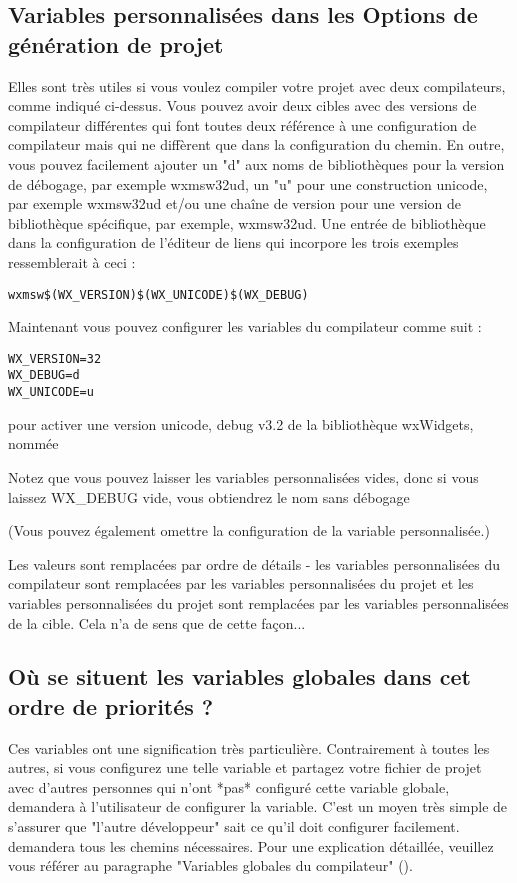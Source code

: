 \subsection{Variables personnalisées dans les Options de génération de projet}

Elles sont très utiles si vous voulez compiler votre projet avec deux compilateurs, comme indiqué ci-dessus. 
Vous pouvez avoir deux cibles avec des versions de compilateur différentes qui font toutes deux référence à une configuration de compilateur mais qui ne diffèrent que dans la configuration du chemin. 
En outre, vous pouvez facilement ajouter un "d" aux noms de bibliothèques pour la version de débogage, par exemple wxmsw32ud, un "u" pour une construction unicode, par exemple wxmsw32ud et/ou une chaîne de version pour une version de bibliothèque spécifique, 
par exemple, wxmsw32ud. \newline
Une entrée de bibliothèque dans la configuration de l'éditeur de liens qui incorpore les trois exemples ressemblerait à ceci :
\begin{verbatim}
wxmsw$(WX_VERSION)$(WX_UNICODE)$(WX_DEBUG)
\end{verbatim}

Maintenant vous pouvez configurer les variables du compilateur comme suit :
\begin{verbatim}
WX_VERSION=32
WX_DEBUG=d
WX_UNICODE=u
\end{verbatim}
pour activer une version unicode, debug v3.2 de la bibliothèque wxWidgets, nommée


Notez que vous pouvez laisser les variables personnalisées vides, donc si vous laissez WX\_DEBUG vide, vous obtiendrez le nom sans débogage


(Vous pouvez également omettre la configuration de la variable personnalisée.)

Les valeurs sont remplacées par ordre de détails - les variables personnalisées du compilateur sont remplacées par les variables personnalisées du projet et les variables personnalisées du projet sont remplacées par les variables personnalisées de la cible. Cela n'a de sens que de cette façon... 

\subsection{Où se situent les variables globales dans cet ordre de priorités ?}

Ces variables ont une signification très particulière. Contrairement à toutes les autres, si vous configurez une telle variable et partagez votre fichier de projet avec d'autres personnes qui n'ont *pas* configuré cette variable globale, \codeblocks 
demandera à l'utilisateur de configurer la variable. C'est un moyen très simple de s'assurer que "l'autre développeur" sait ce qu'il doit configurer facilement. \codeblocks demandera tous les chemins nécessaires.\newline
Pour une explication détaillée, veuillez vous référer au paragraphe "Variables globales du compilateur" (). 
